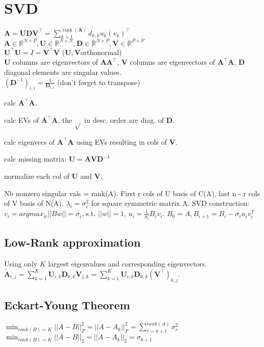 \section{SVD}
$\mathbf{A} = \mathbf{U} \mathbf{D} \mathbf{V}^\top = \sum_{k=1}^{\operatorname{rank}(\mathbf{A})} d_{k,k} u_k (v_k)^\top$\\
$\mathbf{A} \in \mathbb{R}^{N \times P}, \mathbf{U} \in \mathbb{R}^{N \times N}, \mathbf{D} \in \mathbb{R}^{N \times P}, \mathbf{V} \in \mathbb{R}^{P \times P}$\\
$\mathbf{U}^\top \mathbf{U} = I = \mathbf{V}^\top \mathbf{V}$ ($\mathbf{U}, \mathbf{V}$orthonormal)\\
$\mathbf{U}$ columns are eigenvectors of $\mathbf{A} \mathbf{A}^\top$, $\mathbf{V}$ columns are eigenvectors of $\mathbf{A}^\top \mathbf{A}$, $\mathbf{D}$ diagonal elements are singular values.\\
$(\mathbf{D}^{-1})_{i,i} = \frac{1}{\mathbf{D}_{i, i}}$ (don't forget to transpose)

\begin{inparaenum}
	\item calc $\mathbf{A}^\top \mathbf{A}$.
	\item calc EVs of $\mathbf{A}^\top \mathbf{A}$, the $\sqrt{}$ in desc. order are diag. of $\mathbf{D}$.
	\item calc eigenvecs of $\mathbf{A}^\top \mathbf{A}$ using EVs resulting in cols of $\mathbf{V}$.
    \item calc missing matrix: $\mathbf{U} = \mathbf{A} \mathbf{V} \mathbf{D}^{-1}$
	\item normalize each col of $\mathbf{U}$ and $\mathbf{V}$.
\end{inparaenum}

Nb nonzero singular vals = rank(A). First r cols of U basis of C(A), last n - r cols of V basis of N(A). 
$\lambda_i = \sigma_i^2$ for square symmetric matrix A.
SVD construction: $v_i = arg max_w ||Bw|| = \sigma_i $, s.t. $||w|| = 1$, $u_i = \frac{1}{\sigma_i} B_i v_i$. $B_0 = A, B_{i+1} = B_i - \sigma_i u_i v_i^T$


\subsection*{Low-Rank approximation}
Using only $K$ largest eigenvalues and corresponding eigenvectors. $\tilde{\mathbf{A}}_{i, j} = \sum_{k=1}^K \mathbf{U}_{i, k} \mathbf{D}_{k,k} \mathbf{V}_{j, k} = \sum_{k=1}^K \mathbf{U}_{i, k} \mathbf{D}_{k,k} (\mathbf{V}^\top)_{k, j}$.

\subsection*{Eckart-Young Theorem}
$\min_{rank(B)=K} ||A-B||_F^2 = ||A-A_k||_F^2 = \sum_{r=k+1}^{rank(A)} \sigma_r^2$
$\min_{rank(B)=K} ||A-B||_2 = ||A-A_k||_2 = \sigma_{k+1}$

